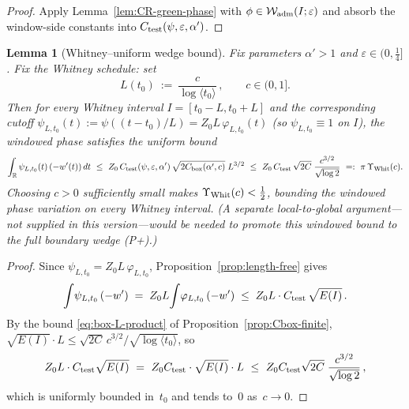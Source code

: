 \documentclass[11pt]{amsart}
\newtheorem{lemma}[theorem]{Lemma}
\theoremstyle{definition}
\theoremstyle{remark}
\newcommand{\angles}[1]{\langle #1\rangle}
\begin{document}
\begin{proof}
Apply Lemma~\ref{lem:CR-green-phase} with \(\phi\in\mathcal W_{\rm adm}(I;\varepsilon)\) and absorb the window-side constants into \(C_{\rm test}(\psi,\varepsilon,\alpha')\).
\end{proof}
\begin{lemma}[Whitney--uniform wedge bound]\label{lem:whitney-uniform-wedge}
Fix parameters \(\alpha'>1\) and \(\varepsilon\in(0,\tfrac14]\).
Fix the Whitney schedule: set
\[
  L(t_0)\ :=\ \frac{c}{\log\angles{t_0}}\,,\qquad c\in(0,1].
\]
Then for every Whitney interval \(I=[t_0-L,t_0+L]\) and the corresponding cutoff
\(\psi_{L,t_0}(t):=\psi((t-t_0)/L)=Z_0L\,\varphi_{L,t_0}(t)\) (so \(\psi_{L,t_0}\equiv 1\) on \(I\)),
the windowed phase satisfies the uniform bound
\[
  \int_{\mathbb R} \psi_{L,t_0}(t)\,(-w'(t))\,dt
  \ \le\ Z_0\,C_{\rm test}(\psi,\varepsilon,\alpha')\,\sqrt{2C_{\rm box}(\alpha',c)}\;L^{3/2}
  \ \le\ Z_0\,C_{\rm test}\,\sqrt{2C}\;\frac{c^{3/2}}{\sqrt{\log 2}}
  \ =:\ \pi\,\Upsilon_{\rm Whit}(c).
\]
Choosing \(c>0\) sufficiently small makes \(\Upsilon_{\rm Whit}(c)<\tfrac12\), bounding the windowed phase variation on every Whitney interval.
(A separate local-to-global argument---not supplied in this version---would be needed to promote this windowed bound to the full boundary wedge \textup{(P+)}.)
\end{lemma}
\begin{proof}
Since \(\psi_{L,t_0}=Z_0L\,\varphi_{L,t_0}\), Proposition~\ref{prop:length-free} gives
\[
  \int\!\psi_{L,t_0}\,(-w')
  \;=\; Z_0 L\!\int\!\varphi_{L,t_0}\,(-w')
  \;\le\; Z_0 L\cdot C_{\rm test}\,\sqrt{E(I)}\,.
\]
By the bound \eqref{eq:box-L-product} of Proposition~\ref{prop:Cbox-finite},
\(\sqrt{E(I)}\cdot L\le \sqrt{2C}\,c^{3/2}/\sqrt{\log\angles{t_0}}\),
so
\[
  Z_0 L\cdot C_{\rm test}\sqrt{E(I)}
  \ =\ Z_0 C_{\rm test}\cdot\sqrt{E(I)}\cdot L
  \ \le\ Z_0 C_{\rm test}\sqrt{2C}\;\frac{c^{3/2}}{\sqrt{\log 2}}\,,
\]
which is uniformly bounded in~\(t_0\) and tends to~\(0\) as~\(c\to 0\).
\end{proof}
\end{document}
